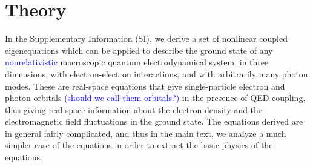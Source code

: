 \documentclass[aps,prb,twocolumn,
	groupedaddress,superscriptaddress,
	amsfonts,amssymb,amsmath,floatfix,
	citeautoscript]{revtex4-1}
\newcommand{\Jadd}[1]{\textcolor{blue}{#1}}
\begin{document}
\section{Theory}
\label{sec:theory}
In the Supplementary Information (SI), we derive a set of nonlinear coupled eigenequations which can be applied to describe the ground state of any \Jadd{nonrelativistic} macroscopic quantum electrodynamical system, in three dimensions, with electron-electron interactions, and with arbitrarily many photon modes. These are real-space equations that give single-particle electron and photon orbitals \Jadd{(should we call them orbitals?)} in the presence of QED coupling, thus giving real-space information about the electron density and the electromagnetic field fluctuations in the ground state. The equations derived are in general fairly complicated, and thus in the main text, we analyze a much simpler case of the equations in order to extract the basic physics of the equations. 
\end{document}
